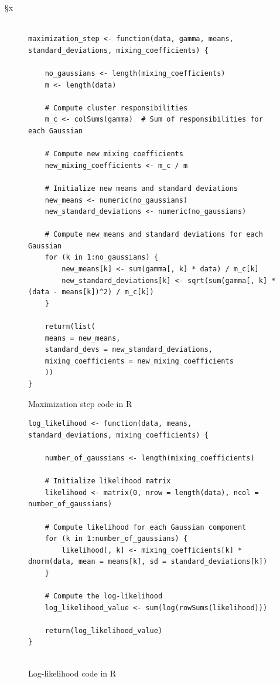 §x\documentclass[]{article}
\begin{document}
\begin{figure}[H]
	\captionsetup{type=lstlisting}
	\begin{lstlisting}

maximization_step <- function(data, gamma, means, standard_deviations, mixing_coefficients) {
	
	no_gaussians <- length(mixing_coefficients)
	m <- length(data)
	
	# Compute cluster responsibilities
	m_c <- colSums(gamma)  # Sum of responsibilities for each Gaussian
	
	# Compute new mixing coefficients
	new_mixing_coefficients <- m_c / m
	
	# Initialize new means and standard deviations
	new_means <- numeric(no_gaussians)
	new_standard_deviations <- numeric(no_gaussians)
	
	# Compute new means and standard deviations for each Gaussian
	for (k in 1:no_gaussians) {
		new_means[k] <- sum(gamma[, k] * data) / m_c[k]
		new_standard_deviations[k] <- sqrt(sum(gamma[, k] * (data - means[k])^2) / m_c[k])
	}
	
	return(list(
	means = new_means,
	standard_devs = new_standard_deviations,
	mixing_coefficients = new_mixing_coefficients
	))
}

	\end{lstlisting}
	\caption{Maximization step code in R}
	\label{lst:em-max}
\end{figure}

\begin{figure}[H]
	\captionsetup{type=lstlisting}
	\begin{lstlisting}
log_likelihood <- function(data, means, standard_deviations, mixing_coefficients) {
	
	number_of_gaussians <- length(mixing_coefficients)
	
	# Initialize likelihood matrix
	likelihood <- matrix(0, nrow = length(data), ncol = number_of_gaussians)
	
	# Compute likelihood for each Gaussian component
	for (k in 1:number_of_gaussians) {
		likelihood[, k] <- mixing_coefficients[k] * dnorm(data, mean = means[k], sd = standard_deviations[k])
	}
	
	# Compute the log-likelihood
	log_likelihood_value <- sum(log(rowSums(likelihood)))
	
	return(log_likelihood_value)
}
			
		\end{lstlisting}
	\caption{Log-likelihood code in R}
	\label{lst:em-ll}
\end{figure}
\end{document}
